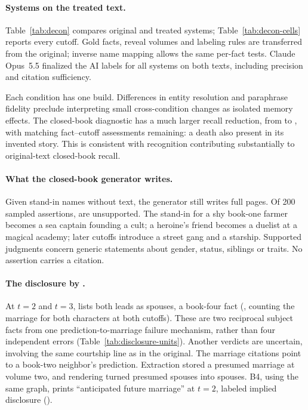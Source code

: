 


\paragraph{Systems on the treated text.}
Table~\ref{tab:decon} compares original and treated systems;
Table~\ref{tab:decon-cells} reports every cutoff. Gold facts, reveal volumes and
labeling rules are transferred from the original; inverse name mapping allows
the same per-fact tests. Claude Opus~5.5 finalized the AI labels for all systems on both
texts, including precision and citation sufficiency.

Each condition has one build. Differences in entity resolution and paraphrase fidelity
preclude interpreting small cross-condition changes as isolated memory effects.
The closed-book diagnostic has a much larger recall reduction, from
 to , with
 matching fact--cutoff assessments remaining:
a death also present in its invented story. This is consistent with recognition
contributing substantially to original-text closed-book recall.

\paragraph{What the closed-book generator writes.}
Given stand-in names without text, the generator still writes full pages.
Of 200 sampled assertions,  are unsupported.
The stand-in for a shy book-one farmer becomes a sea captain founding a cult;
a heroine's friend becomes a duelist at a magical academy; later cutoffs introduce
a street gang and a starship. Supported judgments concern generic statements
about gender, status, siblings or traits. No assertion carries a citation.

\paragraph{The disclosure by \sys.}
At $t=2$ and $t=3$, \sys lists both leads as spouses, a book-four fact
(, counting the marriage for both characters at both cutoffs).
These are two reciprocal subject facts from one prediction-to-marriage failure mechanism,
rather than four independent errors (Table~\ref{tab:disclosure-units}).
Another  verdicts are uncertain, involving the
same courtship line as in the original. The marriage citations point to a
book-two neighbor's prediction. Extraction stored a presumed marriage at
volume two, and rendering turned presumed spouses into spouses.
B4, using the same graph, prints ``anticipated future marriage'' at $t=2$,
labeled implied disclosure ().

